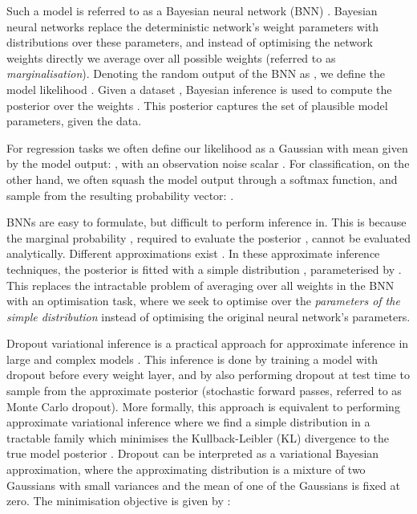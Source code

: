 \documentclass{article}
\begin{document}
Such a model is referred to as a Bayesian neural network (BNN) \citep{ denker1991transforming, mackay1992practical, neal1995bayesian}. 
Bayesian neural networks replace the deterministic network's weight parameters with distributions over these parameters, and instead of optimising the network weights directly we average over all possible weights (referred to as \textit{marginalisation}). 
Denoting the random output of the BNN as , we define the model likelihood .
Given a dataset , Bayesian inference is used to compute the posterior over the weights . This posterior captures the set of plausible model parameters, given the data.

For regression tasks we often define our likelihood as a Gaussian with mean given by the model output:
,
with an observation noise scalar . 
For classification, on the other hand, we often squash the model output through a softmax function, and sample from the resulting probability vector:
.

BNNs are easy to formulate, but difficult to perform inference in. This is because the marginal probability , required to evaluate the posterior , cannot be evaluated analytically. Different approximations exist \citep{graves2011practical, blundell2015weight, hernandez2016black, Gal2016Bayesian}.
In these approximate inference techniques, the posterior  is fitted with a simple distribution , parameterised by . This replaces the intractable problem of averaging over all weights in the BNN with an optimisation task, where we seek to optimise over the \textit{parameters of the simple distribution} instead of optimising the original neural network's parameters.

Dropout variational inference is a practical approach for approximate inference in large and complex models \citep{Gal2016Bayesian}. 
This inference is done by training a model with dropout before every weight layer, and by also performing dropout at test time to sample from the approximate posterior (stochastic forward passes, referred to as Monte Carlo dropout).
More formally, this approach is equivalent to performing approximate variational inference where we find a simple distribution  in a tractable family which minimises the Kullback-Leibler (KL) divergence to the true model posterior . 
Dropout can be interpreted as a variational Bayesian approximation, where the approximating distribution is a mixture of two Gaussians with small variances and the mean of one of the Gaussians is fixed at zero. 
The minimisation objective is given by \citep{jordan1999introduction}:
\end{document}
